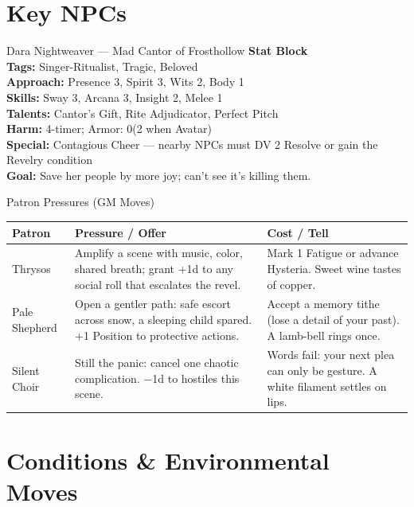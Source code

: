 \documentclass[11pt]{article}
\begin{document}
\section*{Key NPCs}

\begin{npcbox}{Dara Nightweaver --- Mad Cantor of Frosthollow}
    \textbf{Stat Block} \\
    \textbf{Tags:} Singer-Ritualist, Tragic, Beloved \\
    \textbf{Approach:} Presence 3, Spirit 3, Wits 2, Body 1 \\
    \textbf{Skills:} Sway 3, Arcana 3, Insight 2, Melee 1 \\
    \textbf{Talents:} Cantor's Gift, Rite Adjudicator, Perfect Pitch \\
    \textbf{Harm:} 4-timer; Armor: 0(2 when Avatar) \\
    \textbf{Special:} Contagious Cheer --- nearby NPCs must DV 2 Resolve or gain the Revelry condition \\
    \textbf{Goal:} Save her people by more joy; can't see it's killing them.
\end{npcbox}

\begin{mechanicsbox}{Patron Pressures (GM Moves)}
\begin{longtable}{p{}p{}p{}}
    \textbf{Patron} & \textbf{Pressure / Offer} & \textbf{Cost / Tell} \\
    \hline
    Thrysos & Amplify a scene with music, color, shared breath; grant +1d to any social roll that escalates the revel. & Mark 1 Fatigue or advance Hysteria. Sweet wine tastes of copper. \\
    Pale Shepherd & Open a gentler path: safe escort across snow, a sleeping child spared. +1 Position to protective actions. & Accept a memory tithe (lose a detail of your past). A lamb-bell rings once. \\
    Silent Choir & Still the panic: cancel one chaotic complication. −1d to hostiles this scene. & Words fail: your next plea can only be gesture. A white filament settles on lips. \\
\end{longtable}
\end{mechanicsbox}

\section*{Conditions \& Environmental Moves}
\end{document}
